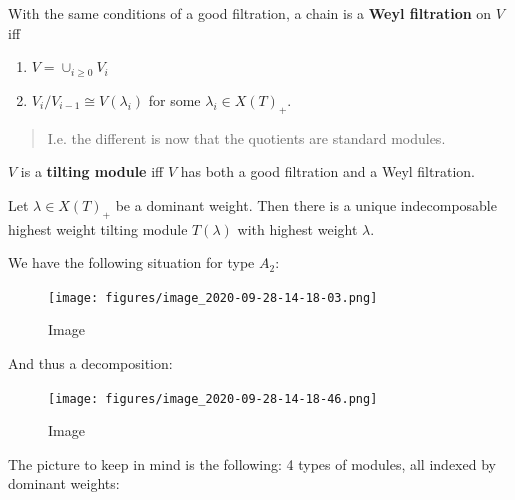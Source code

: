\begin{definition}

With the same conditions of a good filtration, a chain is a \textbf{Weyl
filtration} on \(V\) iff

\begin{enumerate}
\def\labelenumi{\arabic{enumi}.}
\item
  \(V = \cup_{i\geq 0} V_i\)
\item
  \(V_i/V_{i-1} \cong V(\lambda_i)\) for some \(\lambda_i \in X(T)_+\).
\end{enumerate}

\begin{quote}
I.e. the different is now that the quotients are standard modules.
\end{quote}

\end{definition}

\begin{definition}

\(V\) is a \textbf{tilting module} iff \(V\) has both a good filtration
and a Weyl filtration.

\end{definition}

\begin{theorem}[Ringel, 1990s]

Let \(\lambda \in X(T)_+\) be a dominant weight. Then there is a unique
indecomposable highest weight tilting module \(T(\lambda)\) with highest
weight \(\lambda\).

\end{theorem}

\begin{example}

We have the following situation for type \(A_2\):

\begin{figure}
\centering
\texttt{[image: figures/image\_2020-09-28-14-18-03.png]}
\caption{Image}
\end{figure}

And thus a decomposition:

\begin{figure}
\centering
\texttt{[image: figures/image\_2020-09-28-14-18-46.png]}
\caption{Image}
\end{figure}

\end{example}

The picture to keep in mind is the following: 4 types of modules, all
indexed by dominant weights:

